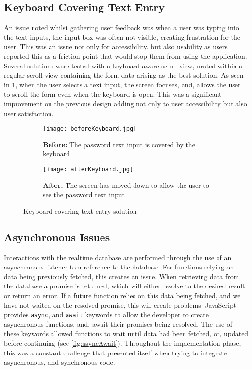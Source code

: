 \subsection*{Keyboard Covering Text Entry}
An issue noted whilst gathering user feedback was when a user was typing into the text inputs, the input box was often not visible, creating frustration for the user. This was an issue not only for accessibility, but also usability as users reported this as a friction point that would stop them from using the application. Several solutions were tested with a keyboard aware scroll view, nested within a regular scroll view containing the form data arising as the best solution. As seen in \ref{fig:keyboard}, when the user selects a text input, the screen focuses, and, allows the user to scroll the form even when the keyboard is open. This was a significant improvement on the previous design adding not only to user accessibility but also user satisfaction.
\begin{figure}[!htbp]
    \centering
    \begin{subfigure}[b]{0.25\textwidth}
        \texttt{[image: beforeKeyboard.jpg]}
        \caption{\textbf{Before:} The password text input is covered by the keyboard}
    \end{subfigure}
    \hspace{1.5em}
    \begin{subfigure}[b]{0.25\textwidth}
        \texttt{[image: afterKeyboard.jpg]}
        \caption{\textbf{After:} The screen has moved down to  allow  the user to see the password text input}
    \end{subfigure}
    \caption{Keyboard covering text entry solution }
    \label{fig:keyboard}
\end{figure}


\subsection*{Asynchronous Issues}
Interactions with the realtime database are performed through the use of an asynchronous listener to a reference to the database. For functions relying on data being previously fetched, this creates an issue. When retrieving data from the database a promise is returned, which will either resolve to the desired result or return an error. If a future function relies on this data being fetched, and we have not waited on the resolved promise, this will create problems. JavaScript provides \texttt{async}, and \texttt{await} keywords to allow the developer to create asynchronous functions, and, await their promises being resolved. The use of these keywords allowed functions to wait until data had been fetched, or, updated before continuing (see \ref{fig:asyncAwait}). Throughout the implementation phase, this was a constant challenge that presented itself when trying to integrate asynchronous, and synchronous code.

